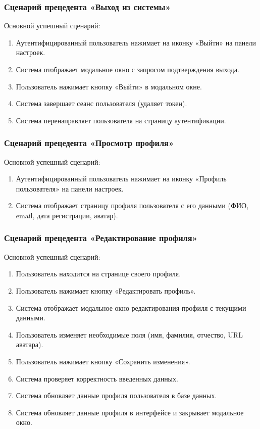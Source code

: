 \subsubsection{Сценарий прецедента «Выход из системы»}
Основной успешный сценарий:
\begin{enumerate}
	\item Аутентифицированный пользователь нажимает на иконку «Выйти» на панели настроек.
	\item Система отображает модальное окно с запросом подтверждения выхода.
	\item Пользователь нажимает кнопку «Выйти» в модальном окне.
	\item Система завершает сеанс пользователя (удаляет токен).
	\item Система перенаправляет пользователя на страницу аутентификации.
\end{enumerate}

\subsubsection{Сценарий прецедента «Просмотр профиля»}
Основной успешный сценарий:
\begin{enumerate}
	\item Аутентифицированный пользователь нажимает на иконку «Профиль пользователя» на панели настроек.
	\item Система отображает страницу профиля пользователя с его данными (ФИО, email, дата регистрации, аватар).
\end{enumerate}

\subsubsection{Сценарий прецедента «Редактирование профиля»}
Основной успешный сценарий:
\begin{enumerate}
	\item Пользователь находится на странице своего профиля.
	\item Пользователь нажимает кнопку «Редактировать профиль».
	\item Система отображает модальное окно редактирования профиля с текущими данными.
	\item Пользователь изменяет необходимые поля (имя, фамилия, отчество, URL аватара).
	\item Пользователь нажимает кнопку «Сохранить изменения».
	\item Система проверяет корректность введенных данных.
	\item Система обновляет данные профиля пользователя в базе данных.
	\item Система обновляет данные профиля в интерфейсе и закрывает модальное окно.
\end{enumerate}


